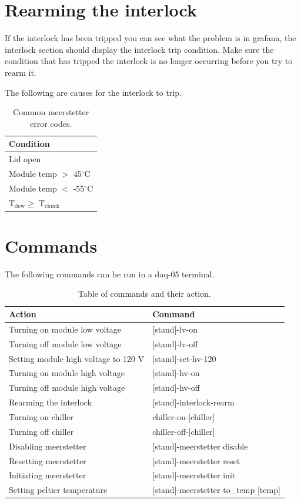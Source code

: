 \documentclass[12pt]{article}
\begin{document}
\section{Rearming the interlock}
\label{sec:interlock}

If the interlock has been tripped you can see what the problem is in grafana, the interlock section should display the interlock trip condition. Make sure the condition that has tripped the interlock is no longer occurring before you try to rearm it. 

The following are causes for the interlock to trip.
\begin{table}[H]
    \centering
    \begin{tabular}{l}
        \hline 
        Condition\\
        \hline
        \hline
        Lid open\\
        Module temp $>$ 45$^\circ$C\\
        Module temp $<$ -55$^\circ$C\\
        T$_\text{dew} \geq$ T$_\text{chuck}$\\
        \hline
    \end{tabular}
    \caption{Common meerstetter error codes.}
    \label{tab:meer}
\end{table}

\newpage
\section{Commands}
The following commands can be run in a daq-05 terminal. 
\begin{table}[H]
    \centering
    \begin{tabular}{l|l}
        \hline 
        Action & Command \\
        \hline
        \hline
        Turning on module low voltage & [stand]-lv-on\\
        Turning off module low voltage & [stand]-lv-off\\
        Setting module high voltage to 120 V & [stand]-set-hv-120\\
        Turning on module high voltage & [stand]-hv-on\\
        Turning off module high voltage & [stand]-hv-off\\
        Rearming the interlock & [stand]-interlock-rearm\\
        Turning on chiller & chiller-on-[chiller]\\
        Turning off chiller & chiller-off-[chiller]\\
        Disabling meerstetter & [stand]-meerstetter disable\\
        Resetting meerstetter & [stand]-meerstetter reset\\
        Initiating meerstetter & [stand]-meerstetter init\\
        Setting peltier temperature & [stand]-meerstetter to\_temp [temp]\\
        \hline
    \end{tabular}
    \caption{Table of commands and their action.}
    \label{tab:commands}
\end{table}
\end{document}

